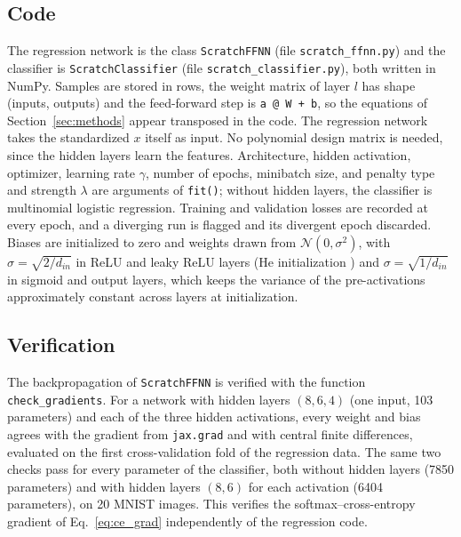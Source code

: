 \documentclass[amssymb,twocolumn,aps]{revtex4}
\begin{document}
\subsection{Code}
The regression network is the class \texttt{ScratchFFNN} (file \texttt{scratch\_ffnn.py}) and the classifier is \texttt{ScratchClassifier} (file \texttt{scratch\_classifier.py}), both written in NumPy\cite{numpy}. Samples are stored in rows, the weight matrix of layer $l$ has shape (inputs, outputs) and the feed-forward step is \texttt{a @ W + b}, so the equations of Section~\ref{sec:methods} appear transposed in the code. The regression network takes the standardized $x$ itself as input. No polynomial design matrix is needed, since the hidden layers learn the features. Architecture, hidden activation, optimizer, learning rate $\gamma$, number of epochs, minibatch size, and penalty type and strength $\lambda$ are arguments of \texttt{fit()}; without hidden layers, the classifier is multinomial logistic regression. Training and validation losses are recorded at every epoch, and a diverging run is flagged and its divergent epoch discarded. Biases are initialized to zero and weights drawn from $\mathcal{N}(0,\sigma^2)$, with $\sigma=\sqrt{2/d_{in}}$ in ReLU and leaky ReLU layers (He initialization \cite{he2015}) and $\sigma=\sqrt{1/d_{in}}$ in sigmoid and output layers, which keeps the variance of the pre-activations approximately constant across layers at initialization.

\subsection{Verification}
The backpropagation of \texttt{ScratchFFNN} is verified with the function \texttt{check\_gradients}. For a network with hidden layers $(8,6,4)$ (one input, 103 parameters) and each of the three hidden activations, every weight and bias agrees with the gradient from \texttt{jax.grad} \cite{jax2018} and with central finite differences, evaluated on the first cross-validation fold of the regression data. The same two checks pass for every parameter of the classifier, both without hidden layers (7850 parameters) and with hidden layers $(8,6)$ for each activation (6404 parameters), on 20 MNIST images. This verifies the softmax--cross-entropy gradient of Eq.~\eqref{eq:ce_grad} independently of the regression code.
\end{document}

